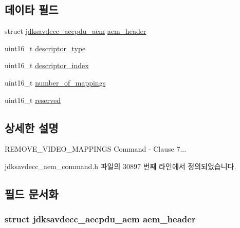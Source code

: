 \subsection*{데이타 필드}
\begin{DoxyCompactItemize}
\item 
struct \hyperlink{structjdksavdecc__aecpdu__aem}{jdksavdecc\+\_\+aecpdu\+\_\+aem} \hyperlink{structjdksavdecc__aem__command__remove__video__mappings_ae1e77ccb75ff5021ad923221eab38294}{aem\+\_\+header}
\item 
uint16\+\_\+t \hyperlink{structjdksavdecc__aem__command__remove__video__mappings_ab7c32b6c7131c13d4ea3b7ee2f09b78d}{descriptor\+\_\+type}
\item 
uint16\+\_\+t \hyperlink{structjdksavdecc__aem__command__remove__video__mappings_a042bbc76d835b82d27c1932431ee38d4}{descriptor\+\_\+index}
\item 
uint16\+\_\+t \hyperlink{structjdksavdecc__aem__command__remove__video__mappings_ac7db472c5622ef473d5d0a5c416d5531}{number\+\_\+of\+\_\+mappings}
\item 
uint16\+\_\+t \hyperlink{structjdksavdecc__aem__command__remove__video__mappings_a5a6ed8c04a3db86066924b1a1bf4dad3}{reserved}
\end{DoxyCompactItemize}


\subsection{상세한 설명}
R\+E\+M\+O\+V\+E\+\_\+\+V\+I\+D\+E\+O\+\_\+\+M\+A\+P\+P\+I\+N\+GS Command -\/ Clause 7... 

jdksavdecc\+\_\+aem\+\_\+command.\+h 파일의 30897 번째 라인에서 정의되었습니다.



\subsection{필드 문서화}
\subsubsection[{\texorpdfstring{aem\+\_\+header}{aem_header}}]{\setlength{\rightskip}{0pt plus 5cm}struct {\bf jdksavdecc\+\_\+aecpdu\+\_\+aem} aem\+\_\+header}\hypertarget{structjdksavdecc__aem__command__remove__video__mappings_ae1e77ccb75ff5021ad923221eab38294}{}\label{structjdksavdecc__aem__command__remove__video__mappings_ae1e77ccb75ff5021ad923221eab38294}


